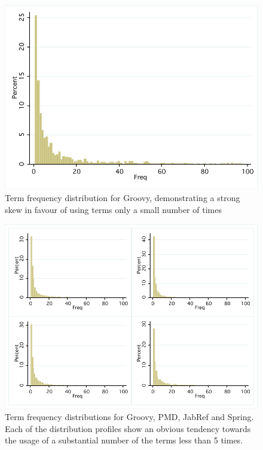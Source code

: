 \begin{figure}[t]
\begin{minipage}{\textwidth}
\centering
\includegraphics[width=\textwidth]{Figures/Vocab-GroovyFreqDist.pdf}
\caption{Term frequency distribution for Groovy, demonstrating a strong skew in favour of using terms only a small number of times}
\label{fig:vocab-freq-dist-groovy}
\end{minipage}
\end{figure}

\begin{figure}[t]
\centering
\includegraphics[width=\textwidth]{Figures/Vocab-FrequencyDistComparison.pdf}
\caption{Term frequency distributions for Groovy, PMD, JabRef and Spring. Each of the distribution profiles show an obvious tendency towards the usage of a substantial number of the terms less than 5 times.}
\label{fig:vocab-freq-dist-comparison}
\end{figure}

